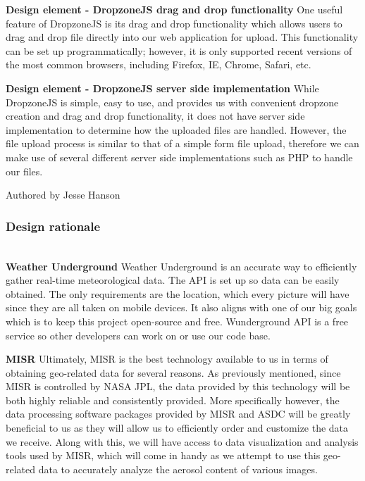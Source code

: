 \documentclass[onecolumn, draftclsnofoot,10pt, compsoc]{IEEEtran}
\begin{document}
\begin{flushleft}
\medskip

\textbf{Design element - DropzoneJS drag and drop functionality}
One useful feature of DropzoneJS is its drag and drop functionality which allows users to drag and drop file directly into our web application for upload. This functionality can be set up programmatically; however, it is only supported recent versions of the most common browsers, including Firefox, IE, Chrome, Safari, etc. \cite{14} 

\medskip

\textbf{Design element - DropzoneJS server side implementation}
While DropzoneJS is simple, easy to use, and provides us with convenient dropzone creation and drag and drop functionality, it does not have server side implementation to determine how the uploaded files are handled. However, the file upload process is similar to that of a simple form file upload, therefore we can make use of several different server side implementations such as PHP to handle our files. \cite{14}

\smallskip

\footnotesize Authored by Jesse Hanson
\normalsize

\bigskip

\subsubsection{Design rationale} \ \\
\textbf{Weather Underground} Weather Underground is an accurate way to efficiently gather real-time meteorological data. The API is set up so data can be easily obtained. The only requirements are the location, which every picture will have since they are all taken on mobile devices. It also aligns with one of our big goals which is to keep this project open-source and free. Wunderground API is a free service so other developers can work on or use our code base.

\medskip

\textbf{MISR} Ultimately, MISR is the best technology available to us in terms of obtaining geo-related data for several reasons. As previously mentioned, since MISR is controlled by NASA JPL, the data provided by this technology will be both highly reliable and consistently provided. More specifically however, the data processing software packages provided by MISR and ASDC will be greatly beneficial to us as they will allow us to efficiently order and customize the data we receive. Along with this, we will have access to data visualization and analysis tools used by MISR, which will come in handy as we attempt to use this geo-related data to accurately analyze the aerosol content of various images.


\end{flushleft}
\end{document}
